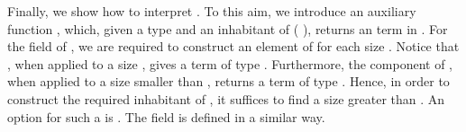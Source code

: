 
Finally, we show how to interpret . To this aim, we
introduce an auxiliary function , which, given a type
 and an inhabitant  of ( ), returns an
term in  .  For the field  of 
 , we are required to construct an element of 
  for each size .
Notice that  , when applied to a size
, gives a term  of type   . Furthermore, the
component  of , when applied to a size  smaller
than , returns a term of type   .
Hence, in order to construct the required inhabitant of   , it suffices to find a size  greater than .
An option for such a  is . The field  is defined in a similar way.

